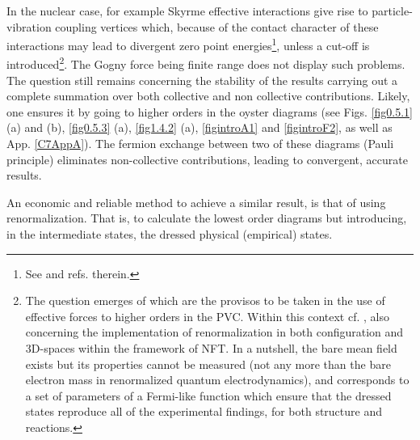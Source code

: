 \begin{subappendices}
 In the nuclear case, for example Skyrme effective interactions give 
 rise to particle-vibration coupling vertices which, because of the contact character of these interactions 
 may lead to divergent zero point energies\footnote{See \cite{Hellemans:13,Pastore:15} and refs. therein.}, unless a cut-off is introduced\footnote{The question emerges of which are the provisos to be taken in the use of effective forces to higher orders in the PVC. Within this context cf. \cite{Mahaux:85}, also \cite{Broglia:16,Barranco:17} concerning the implementation of renormalization in both configuration and 3D-spaces within the framework of NFT. In a nutshell, the bare mean field exists but its properties cannot be measured (not any more than the bare electron mass in renormalized quantum electrodynamics), and corresponds to a set of parameters of a Fermi-like function which ensure that the dressed states reproduce all of the experimental findings, for both structure and reactions.}.
 The Gogny force being finite range does not display such problems. The question still remains concerning the stability of the results carrying out a complete summation over both collective and non collective contributions. 
 Likely, one ensures it   by going to higher orders in the oyster diagrams (see Figs. \ref{fig0.5.1} (a) and (b), \ref{fig0.5.3} (a),  \ref{fig1.4.2} (a), \ref{figintroA1} and \ref{figintroF2}, as well as App. \ref{C7AppA}). 
 The fermion exchange between two of these diagrams (Pauli principle)  eliminates  non-collective
 contributions, leading to convergent, accurate results.
 
 An economic and reliable method to achieve a similar result, 
 is that of using renormalization. That is, to calculate the lowest order diagrams 
 but introducing, in the intermediate states, the dressed physical (empirical) states.
 
 


\end{subappendices}


 



































% 
%